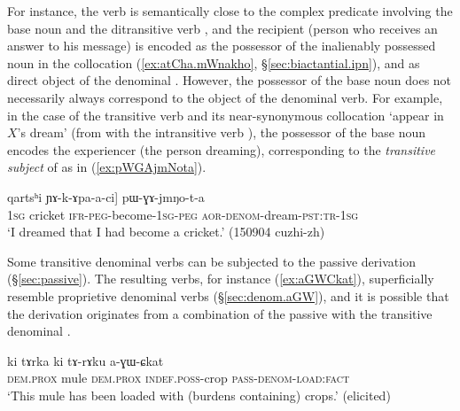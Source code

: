 For instance, the verb   is semantically close to the complex predicate involving the base noun  and the ditransitive verb , and the recipient (person who receives an answer to his message) is encoded as the possessor of the inalienably possessed noun  in the collocation (\ref{ex:atCha.mWnakho}, §\ref{sec:biactantial.ipn}), and as direct object of the denominal . However, the possessor of the base noun does not necessarily always correspond to the object of the  denominal verb. For example, in the case of the transitive verb  and its near-synonymous collocation  `appear in $X$'s dream' (from  with the intransitive verb ), the possessor of the base noun  encodes the  experiencer (the person dreaming), corresponding to the \textit{transitive subject}  of  as in (\ref{ex:pWGAjmNota}). 

\begin{exe}
\ex \label{ex:pWGAjmNota}
 \gll [aʑo [...] qartsʰi ɲɤ-k-ɤpa-a-ci] pɯ-ɣɤ-jmŋo-t-a \\
\textsc{1sg} {  } cricket \textsc{ifr}-\textsc{peg}-become-\textsc{1sg}-\textsc{peg} \textsc{aor}-\textsc{denom}-dream-\textsc{pst}:\textsc{tr}-\textsc{1sg} \\
\glt `I dreamed that I had become a cricket.' (150904 cuzhi-zh)
\end{exe}
 
Some transitive  denominal verbs can be subjected to the  passive derivation (§\ref{sec:passive}). The resulting verbs, for instance   (\ref{ex:aGWCkat}), superficially resemble  proprietive denominal verbs (§\ref{sec:denom.aGW}), and it is possible that the   derivation originates from a combination of the passive with the transitive denominal .
 

\begin{exe}
\ex \label{ex:aGWCkat}
 \gll ki tɤrka ki tɤ-rɤku a-ɣɯ-ɕkat \\
 \textsc{dem}.\textsc{prox} mule  \textsc{dem}.\textsc{prox} \textsc{indef}.\textsc{poss}-crop \textsc{pass}-\textsc{denom}-\textsc{load}:\textsc{fact} \\
 \glt `This mule has been loaded with (burdens containing) crops.' (elicited)
 \end{exe}
 
